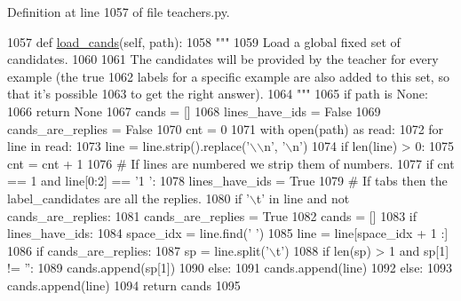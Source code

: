 Definition at line 1057 of file teachers.\+py.


\begin{DoxyCode}
1057     \textcolor{keyword}{def }\hyperlink{namespaceparlai_1_1utils_1_1misc_ad935ab0a9d49b897c5e3efdbe1c46c4d}{load\_cands}(self, path):
1058         \textcolor{stringliteral}{"""}
1059 \textcolor{stringliteral}{        Load a global fixed set of candidates.}
1060 \textcolor{stringliteral}{}
1061 \textcolor{stringliteral}{        The candidates will be provided by the teacher for every example (the true}
1062 \textcolor{stringliteral}{        labels for a specific example are also added to this set, so that it's possible}
1063 \textcolor{stringliteral}{        to get the right answer).}
1064 \textcolor{stringliteral}{        """}
1065         \textcolor{keywordflow}{if} path \textcolor{keywordflow}{is} \textcolor{keywordtype}{None}:
1066             \textcolor{keywordflow}{return} \textcolor{keywordtype}{None}
1067         cands = []
1068         lines\_have\_ids = \textcolor{keyword}{False}
1069         cands\_are\_replies = \textcolor{keyword}{False}
1070         cnt = 0
1071         with open(path) \textcolor{keyword}{as} read:
1072             \textcolor{keywordflow}{for} line \textcolor{keywordflow}{in} read:
1073                 line = line.strip().replace(\textcolor{stringliteral}{'\(\backslash\)\(\backslash\)n'}, \textcolor{stringliteral}{'\(\backslash\)n'})
1074                 \textcolor{keywordflow}{if} len(line) > 0:
1075                     cnt = cnt + 1
1076                     \textcolor{comment}{# If lines are numbered we strip them of numbers.}
1077                     \textcolor{keywordflow}{if} cnt == 1 \textcolor{keywordflow}{and} line[0:2] == \textcolor{stringliteral}{'1 '}:
1078                         lines\_have\_ids = \textcolor{keyword}{True}
1079                     \textcolor{comment}{# If tabs then the label\_candidates are all the replies.}
1080                     \textcolor{keywordflow}{if} \textcolor{stringliteral}{'\(\backslash\)t'} \textcolor{keywordflow}{in} line \textcolor{keywordflow}{and} \textcolor{keywordflow}{not} cands\_are\_replies:
1081                         cands\_are\_replies = \textcolor{keyword}{True}
1082                         cands = []
1083                     \textcolor{keywordflow}{if} lines\_have\_ids:
1084                         space\_idx = line.find(\textcolor{stringliteral}{' '})
1085                         line = line[space\_idx + 1 :]
1086                         \textcolor{keywordflow}{if} cands\_are\_replies:
1087                             sp = line.split(\textcolor{stringliteral}{'\(\backslash\)t'})
1088                             \textcolor{keywordflow}{if} len(sp) > 1 \textcolor{keywordflow}{and} sp[1] != \textcolor{stringliteral}{''}:
1089                                 cands.append(sp[1])
1090                         \textcolor{keywordflow}{else}:
1091                             cands.append(line)
1092                     \textcolor{keywordflow}{else}:
1093                         cands.append(line)
1094         \textcolor{keywordflow}{return} cands
1095 
\end{DoxyCode}
